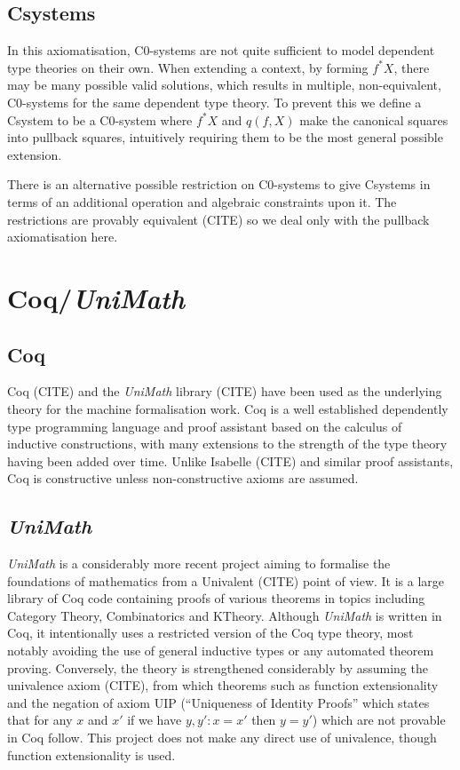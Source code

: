 \subsection{Csystems}
In this axiomatisation, C0-systems are not quite sufficient to model dependent
type theories on their own. When extending a context, by forming $f^*X$, there
may be many possible valid solutions, which results in multiple, non-equivalent,
C0-systems for the same dependent type theory. To prevent this we define a
Csystem to be a C0-system where $f^*X$ and $q(f, X)$ make the canonical squares
into pullback squares, intuitively requiring them to be the most general
possible extension.

There is an alternative possible restriction on C0-systems to give Csystems in
terms of an additional operation and algebraic constraints upon it. The
restrictions are provably equivalent (CITE) so we deal only with the pullback
axiomatisation here.

\section{Coq/\textit{UniMath}}
\subsection{Coq}
Coq (CITE) and the \textit{UniMath} library (CITE) have been used as the
underlying theory for the machine formalisation work. Coq is a well established
dependently type programming language and proof assistant based on the calculus
of inductive constructions, with many extensions to the strength of the type
theory having been added over time. Unlike Isabelle (CITE) and similar proof
assistants, Coq is constructive unless non-constructive axioms are assumed.

\subsection{\textit{UniMath}}
\textit{UniMath} is a considerably more recent project aiming to formalise the
foundations of mathematics from a Univalent (CITE) point of view. It is a large
library of Coq code containing proofs of various theorems in topics including
Category Theory, Combinatorics and KTheory. Although \textit{UniMath} is written
in Coq, it intentionally uses a restricted version of the Coq type theory, most
notably avoiding the use of general inductive types or any automated theorem
proving. Conversely, the theory is strengthened considerably by assuming the
univalence axiom (CITE), from which theorems such as function extensionality and
the negation of axiom UIP (``Uniqueness of Identity Proofs'' which states that
for any $x$ and $x'$ if we have $y, y' : x=x'$ then $y=y'$) which are not
provable in Coq follow. This project does not make any direct use of univalence,
though function extensionality is used.

